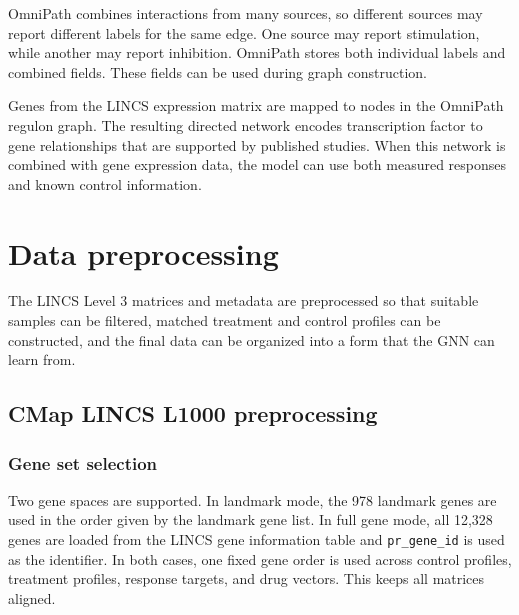 \noindent OmniPath combines interactions from many sources, so different sources may report different labels for the same edge. One source may report stimulation, while another may report inhibition. OmniPath stores both individual labels and combined fields. These fields can be used during graph construction.

\noindent Genes from the LINCS expression matrix are mapped to nodes in the OmniPath regulon graph. The resulting directed network encodes transcription factor to gene relationships that are supported by published studies. When this network is combined with gene expression data, the model can use both measured responses and known control information.

\FloatBarrier
\section{Data preprocessing}

\noindent The LINCS Level 3 matrices and metadata are preprocessed so that suitable samples can be filtered, matched treatment and control profiles can be constructed, and the final data can be organized into a form that the GNN can learn from.

\subsection{CMap LINCS L1000 preprocessing}

\subsubsection{Gene set selection}
Two gene spaces are supported. In landmark mode, the 978 landmark genes are used in the order given by the landmark gene list. In full gene mode, all 12,328 genes are loaded from the LINCS gene information table and \texttt{pr\_gene\_id} is used as the identifier. In both cases, one fixed gene order is used across control profiles, treatment profiles, response targets, and drug vectors. This keeps all matrices aligned.

